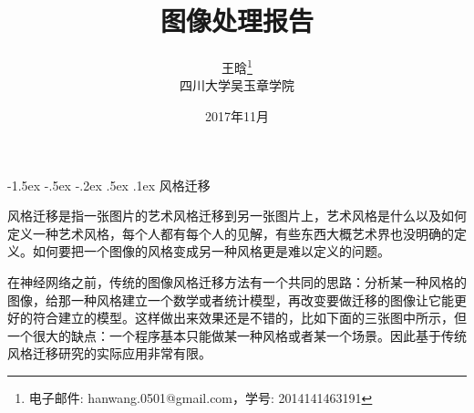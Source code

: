 \documentclass[a4paper, 11pt]{article}
\makeatletter
\newcommand{\sihao}{\fontsize{14pt}{\baselineskip}\selectfont}
\newcommand{\xiaosihao}{\fontsize{12pt}{\baselineskip}\selectfont}
\renewcommand\section{\@startsection{section}{1}{\z@}%
{-1.5ex \@plus -.5ex \@minus -.2ex}%
{.5ex \@plus .1ex}%
{\normalfont\sihao\CJKfamily{hei}}}
\makeatother
\begin{document}
\newtheorem{example}{例}             %
\newtheorem{theorem}{定理}[section]  %
\newtheorem{definition}{定义}
\newtheorem{axiom}{公理}
\newtheorem{property}{性质}
\newtheorem{proposition}{命题}
\newtheorem{lemma}{引理}
\newtheorem{corollary}{推论}
\newtheorem{remark}{注解}
\newtheorem{condition}{条件}
\newtheorem{conclusion}{结论}
\newtheorem{assumption}{假设}

\renewcommand{\contentsname}{目录}  %
\renewcommand{\abstractname}{摘要}  %
\renewcommand{\refname}{参考文献}   %
\renewcommand{\indexname}{索引}
\renewcommand{\figurename}{图}
\renewcommand{\tablename}{表}
\renewcommand{\appendixname}{附录}
\newcommand{\upcite}[1]{\textsuperscript{\cite{#1}}}
\makeatletter
{}
\makeatother
\renewcommand{\theequation}{\arabic{section}.\arabic{equation}}
\renewcommand{\thefigure}{\arabic{section}.\arabic{figure}}

\renewcommand{\algorithmicrequire}{\textbf{Input:}} %
\renewcommand{\algorithmicensure}{\textbf{Output:}} %

\title{图像处理报告}
\author{王晗\footnote{电子邮件: hanwang.0501@gmail.com，学号: 2014141463191}\\[2ex]
\xiaosihao 四川大学吴玉章学院\\[2ex]
}
\date{2017年11月}


\maketitle

\tableofcontents
\newpage
\section{风格迁移}

风格迁移是指一张图片的艺术风格迁移到另一张图片上，艺术风格是什么以及如何定义一种艺术风格，每个人都有每个人的见解，有些东西大概艺术界也没明确的定义。如何要把一个图像的风格变成另一种风格更是难以定义的问题。

在神经网络之前，传统的图像风格迁移方法有一个共同的思路：分析某一种风格的图像，给那一种风格建立一个数学或者统计模型，再改变要做迁移的图像让它能更好的符合建立的模型。这样做出来效果还是不错的，比如下面的三张图中所示，但一个很大的缺点：一个程序基本只能做某一种风格或者某一个场景。因此基于传统风格迁移研究的实际应用非常有限。
\end{document}
